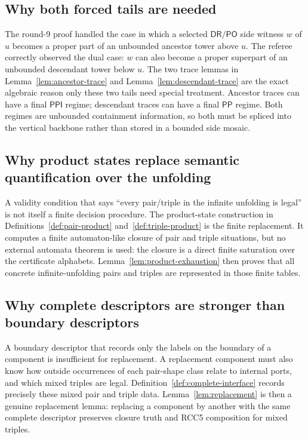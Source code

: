 \documentclass[11pt]{article}
\newcommand{\DR}{\mathsf{DR}}
\newcommand{\PO}{\mathsf{PO}}
\newcommand{\PP}{\mathsf{PP}}
\newcommand{\PPI}{\mathsf{PPI}}
\begin{document}
\subsection{Why both forced tails are needed}
The round-9 proof handled the case in which a selected $\DR/\PO$ side witness $w$ of $u$ becomes a proper part of an unbounded ancestor tower above $u$.  The referee correctly observed the dual case: $w$ can also become a proper superpart of an unbounded descendant tower below $u$.  The two trace lemmas in Lemma~\ref{lem:ancestor-trace} and Lemma~\ref{lem:descendant-trace} are the exact algebraic reason only these two tails need special treatment.  Ancestor traces can have a final $\PPI$ regime; descendant traces can have a final $\PP$ regime.  Both regimes are unbounded containment information, so both must be spliced into the vertical backbone rather than stored in a bounded side mosaic.

\subsection{Why product states replace semantic quantification over the unfolding}
A validity condition that says ``every pair/triple in the infinite unfolding is legal'' is not itself a finite decision procedure.  The product-state construction in Definitions~\ref{def:pair-product} and~\ref{def:triple-product} is the finite replacement.  It computes a finite automaton-like closure of pair and triple situations, but no external automata theorem is used: the closure is a direct finite saturation over the certificate alphabets.  Lemma~\ref{lem:product-exhaustion} then proves that all concrete infinite-unfolding pairs and triples are represented in those finite tables.

\subsection{Why complete descriptors are stronger than boundary descriptors}
A boundary descriptor that records only the labels on the boundary of a component is insufficient for replacement.  A replacement component must also know how outside occurrences of each pair-shape class relate to internal ports, and which mixed triples are legal.  Definition~\ref{def:complete-interface} records precisely these mixed pair and triple data.  Lemma~\ref{lem:replacement} is then a genuine replacement lemma: replacing a component by another with the same complete descriptor preserves closure truth and RCC5 composition for mixed triples.
\end{document}
